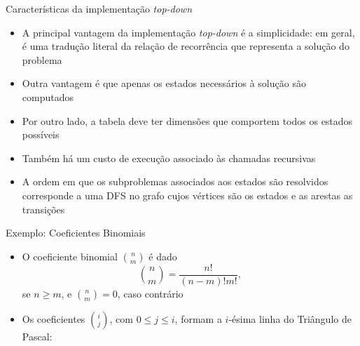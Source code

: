 \begin{frame}[fragile]{Características da implementação {\it top-down}}

    \begin{itemize}
        \item A principal vantagem da implementação \textit{top-down} é a simplicidade: em geral,
            é uma tradução literal da relação de recorrência que representa a solução do problema
        \pause

        \item Outra vantagem é que apenas os estados necessários à solução são computados
        \pause

        \item Por outro lado, a tabela deve ter dimensões que comportem todos os estados possíveis
        \pause

        \item Também há um custo de execução associado às chamadas recursivas 
        \pause

        \item A ordem em que os subproblemas associados aos estados são resolvidos corresponde
            a uma DFS no grafo cujos vértices são os estados e as arestas as transições
    \end{itemize}

\end{frame}

\begin{frame}[fragile]{Exemplo: Coeficientes Binomiais}

    \begin{itemize}

        \item O coeficiente binomial $\binom{n}{m}$ é dado
        \[
            \binom{n}{m} = \frac{n!}{(n - m)!m!},
        \]
        se $n \geq m$, e $\binom{n}{m} = 0$, caso contrário
        \pause

        \item Os coeficientes $\binom{i}{j}$, com $0\leq j\leq i$, formam a $i$-ésima linha do
            Triângulo de Pascal:

            

    \end{itemize}
 
\end{frame}

